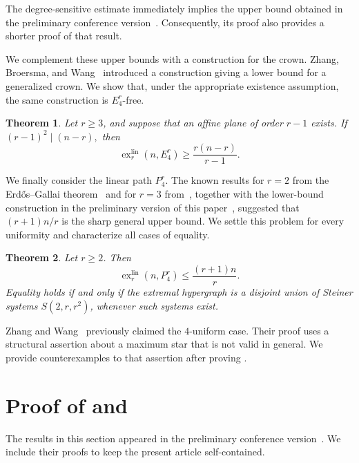 \documentclass[11pt,a4paper]{article}
\newtheorem{theorem}{Theorem}[section]
\newtheorem{corollary}[theorem]{Corollary}
\theoremstyle{definition}
\theoremstyle{remark}
\begin{document}
The degree-sensitive estimate immediately implies the upper bound
obtained in the preliminary conference version~\cite{AdakVerma2026}.
Consequently, its proof also provides a shorter proof of that result.


We complement these upper bounds with a construction for the crown.
Zhang, Broersma, and Wang~\cite{zhang2025generalized} introduced a
construction giving a lower bound for a generalized crown. We show
that, under the appropriate existence assumption, the same
construction is \(E_4^r\)-free.

\begin{theorem}\label{E4lower}
Let \(r\geq 3\), and suppose that an affine plane of order \(r-1\)
exists. If
$(r-1)^2\mid(n-r),
$ then
$$
\operatorname{ex}^{\mathrm{lin}}_r(n,E_4^r)
\geq
\frac{r(n-r)}{r-1}.
$$
\end{theorem}

We finally consider the linear path \(P_4^r\). The known results for
\(r=2\) from the Erd\H{o}s--Gallai theorem~\cite{gallai1959maximal}
and for \(r=3\) from~\cite{gyarfas2022linear}, together with the
lower-bound construction in the preliminary version of this
paper~\cite{AdakVerma2026}, suggested that \((r+1)n/r\) is the sharp
general upper bound. We settle this problem for every uniformity and
characterize all cases of equality.

\begin{theorem}\label{P4thm}
Let \(r\geq 2\). Then
$$
\operatorname{ex}^{\mathrm{lin}}_r(n,P_4^r)
\leq
\frac{(r+1)n}{r}.
$$
Equality holds if and only if the extremal hypergraph is a disjoint
union of Steiner systems \(S(2,r,r^2)\), whenever such systems exist.
\end{theorem}

Zhang and Wang~\cite{zhang2025linear} previously claimed the
\(4\)-uniform case. Their proof uses a structural assertion about a
maximum star that is not valid in general. We provide counterexamples
to that assertion after proving .
    \section{Proof of  and }
    The results in this section appeared in the preliminary conference
version~\cite{AdakVerma2026}. We include their proofs to keep the
present article self-contained.
\end{document}
